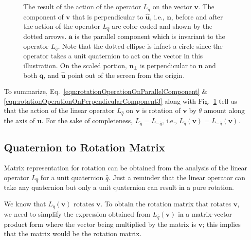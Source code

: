 \begin{figure}[h]

\caption{The result of the action of the operator $L_{\hat q}$ on the vector $\boldsymbol{v}$. The component of $\boldsymbol{v}$ that is perpendicular to $\boldsymbol{\hat u}$, i.e., $\boldsymbol{n}$, before and after the action of the operator $L_{\hat q}$ are color-coded and shown by the dotted arrows. $\boldsymbol{a}$ is the parallel component which is invariant to the operator $L_{\hat q}$. Note that the dotted ellipse is infact a circle since the operator takes a unit quaternion to act on the vector in this illustration. On the scaled portion, $\boldsymbol{n}_\perp$ is perpendicular to $\boldsymbol{n}$ and both $\boldsymbol{q}$, and $\boldsymbol{\hat u}$ point out of the screen from the origin.}
\label{fig:resultOfLOnV}
\end{figure}

To summarize, Eq.~\ref{eqn:rotationOperationOnParallelComponent} \& \ref{eqn:rotationOperationOnPerpendicularComponent3} along with Fig.~\ref{fig:resultOfLOnV} tell us that the action of the linear operator $L_{\hat q}$ on $\boldsymbol{v}$ is rotation of $\boldsymbol{v}$ by $\theta$ amount along the axis of $\boldsymbol{\hat u}$. For the sake of completeness, $L_{\hat q} = L_{-\hat q}$, i.e., $L_{\hat q}(\boldsymbol{v}) = L_{-\hat q}(\boldsymbol{v})$.

\subsection{Quaternion to Rotation Matrix}
\hspace{\parindent}Matrix representation for rotation can be obtained from the analysis of the linear operator $L_{\hat q}$ for a unit quaternion $\hat q$. Just a reminder that the linear operator can take any quaternion but only a unit quaternion can result in a pure rotation.

We know that $L_{\hat q}(\boldsymbol{v})$ rotates $\boldsymbol{v}$. To obtain the rotation matrix that rotates $\boldsymbol{v}$, we need to simplify the expression obtained from $L_{\hat q}(\boldsymbol{v})$ in a matrix-vector product form where the vector being multiplied by the matrix is $\boldsymbol{v}$; this implies that the matrix would be the rotation matrix.

